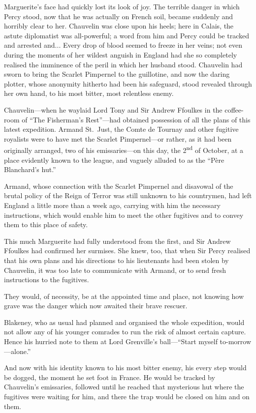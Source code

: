 \documentclass[paper=5.5in:8.5in,BCOR=7mm,twoside,DIV=calc,12pt,usegeometry,chapterprefix,endperiod,headings=big]{scrbook}
\begin{document}
Marguerite's face had quickly lost its look of joy. The terrible danger in which Percy stood, now that he was actually on French soil, became suddenly and horribly clear to her. Chauvelin was close upon his heels; here in Calais, the astute diplomatist was all-powerful; a word from him and Percy could be tracked and arrested and... Every drop of blood seemed to freeze in her veins; not even during the moments of her wildest anguish in England had she so completely realised the imminence of the peril in which her husband stood. Chauvelin had sworn to bring the Scarlet Pimpernel to the guillotine, and now the daring plotter, whose anonymity hitherto had been his safeguard, stood revealed through her own hand, to his most bitter, most relentless enemy.

Chauvelin---when he waylaid Lord Tony and Sir Andrew Ffoulkes in the coffee-room of \enquote{The Fisherman's Rest}---had obtained possession of all the plans of this latest expedition. Armand St.~Just, the Comte de Tournay and other fugitive royalists were to have met the Scarlet Pimpernel---or rather, as it had been originally arranged, two of his emissaries---on this day, the 2\textsuperscript{nd} of October, at a place evidently known to the league, and vaguely alluded to as the \enquote{Père Blanchard's hut.}

Armand, whose connection with the Scarlet Pimpernel and disavowal of the brutal policy of the Reign of Terror was still unknown to his countrymen, had left England a little more than a week ago, carrying with him the necessary instructions, which would enable him to meet the other fugitives and to convey them to this place of safety.

This much Marguerite had fully understood from the first, and Sir Andrew Ffoulkes had confirmed her surmises. She knew, too, that when Sir Percy realised that his own plans and his directions to his lieutenants had been stolen by Chauvelin, it was too late to communicate with Armand, or to send fresh instructions to the fugitives.

They would, of necessity, be at the appointed time and place, not knowing how grave was the danger which now awaited their brave rescuer.

Blakeney, who as usual had planned and organised the whole expedition, would not allow any of his younger comrades to run the risk of almost certain capture. Hence his hurried note to them at Lord Grenville's ball---\enquote{Start myself to-morrow---alone.}

And now with his identity known to his most bitter enemy, his every step would be dogged, the moment he set foot in France. He would be tracked by Chauvelin's emissaries, followed until he reached that mysterious hut where the fugitives were waiting for him, and there the trap would be closed on him and on them.
\end{document}
